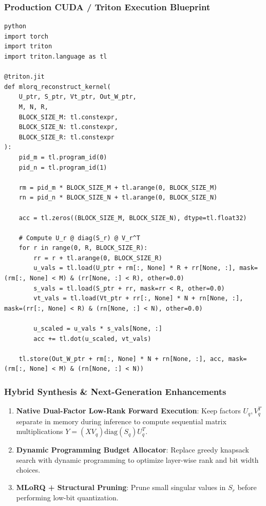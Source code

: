 \subsubsection*{Production CUDA / Triton Execution Blueprint}

\vspace{0.5em}
\begin{mdframed}[backgroundcolor=codebg, linecolor=codeframe, linewidth=1pt, roundcorner=4pt, innerleftmargin=2pt, innerrightmargin=5pt, innertopmargin=5pt, innerbottommargin=5pt]
\begin{lstlisting}
python
import torch
import triton
import triton.language as tl

@triton.jit
def mlorq_reconstruct_kernel(
    U_ptr, S_ptr, Vt_ptr, Out_W_ptr,
    M, N, R,
    BLOCK_SIZE_M: tl.constexpr,
    BLOCK_SIZE_N: tl.constexpr,
    BLOCK_SIZE_R: tl.constexpr
):
    pid_m = tl.program_id(0)
    pid_n = tl.program_id(1)

    rm = pid_m * BLOCK_SIZE_M + tl.arange(0, BLOCK_SIZE_M)
    rn = pid_n * BLOCK_SIZE_N + tl.arange(0, BLOCK_SIZE_N)

    acc = tl.zeros((BLOCK_SIZE_M, BLOCK_SIZE_N), dtype=tl.float32)

    # Compute U_r @ diag(S_r) @ V_r^T
    for r in range(0, R, BLOCK_SIZE_R):
        rr = r + tl.arange(0, BLOCK_SIZE_R)
        u_vals = tl.load(U_ptr + rm[:, None] * R + rr[None, :], mask=(rm[:, None] < M) & (rr[None, :] < R), other=0.0)
        s_vals = tl.load(S_ptr + rr, mask=rr < R, other=0.0)
        vt_vals = tl.load(Vt_ptr + rr[:, None] * N + rn[None, :], mask=(rr[:, None] < R) & (rn[None, :] < N), other=0.0)

        u_scaled = u_vals * s_vals[None, :]
        acc += tl.dot(u_scaled, vt_vals)

    tl.store(Out_W_ptr + rm[:, None] * N + rn[None, :], acc, mask=(rm[:, None] < M) & (rn[None, :] < N))
\end{lstlisting}
\end{mdframed}
\vspace{0.5em}


\subsubsection*{Hybrid Synthesis \& Next-Generation Enhancements}

\begin{enumerate}
\item \textbf{Native Dual-Factor Low-Rank Forward Execution}: Keep factors $U_q, V_q^T$ separate in memory during inference to compute sequential matrix multiplications $Y = (X V_q) \text{diag}(S_q) U_q^T$.
\item \textbf{Dynamic Programming Budget Allocator}: Replace greedy knapsack search with dynamic programming to optimize layer-wise rank and bit width choices.
\item \textbf{MLoRQ + Structural Pruning}: Prune small singular values in $S_r$ before performing low-bit quantization.

\end{enumerate}
